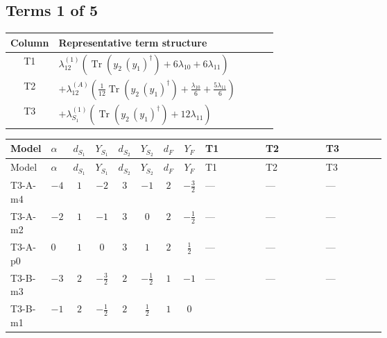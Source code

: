 \documentclass[8pt]{article}
\begin{document}
\begin{landscape}
\subsection*{Terms 1 of 5}
\begin{center}
\begin{tabular}{@{}c >{\raggedright\arraybackslash}p{0.82\linewidth}@{}}
\toprule
Column & Representative term structure \\
\midrule
T1 & \(\displaystyle {\lambda_{12}^{(1)}} (\operatorname{Tr}\!\left({y_2}\,\left({y_1}\right)^{\dagger}\right)+6 {\lambda_{10}}+6 {\lambda_{11}})\) \\
\midrule
T2 & \(\displaystyle +{\lambda_{12}^{(A)}} \left(\frac{1}{12} \operatorname{Tr}\!\left({y_2}\,\left({y_1}\right)^{\dagger}\right)+\frac{{\lambda_{10}}}{6}+\frac{5 {\lambda_{11}}}{6}\right)\) \\
\midrule
T3 & \(\displaystyle +{\lambda_{S_1}^{(1)}} (\operatorname{Tr}\!\left({y_2}\,\left({y_1}\right)^{\dagger}\right)+12 {\lambda_{11}})\) \\
\midrule
\bottomrule
\end{tabular}
\end{center}
\smallskip
\tiny
\begin{longtable}{@{}llcccccc >{\raggedright\arraybackslash}p{0.21\linewidth} >{\raggedright\arraybackslash}p{0.21\linewidth} >{\raggedright\arraybackslash}p{0.21\linewidth}@{}}
\toprule
Model & $\alpha$ & $d_{S_1}$ & $Y_{S_1}$ & $d_{S_2}$ & $Y_{S_2}$ & $d_F$ & $Y_F$ & T1 & T2 & T3 \\
\midrule
\endfirsthead
\toprule
Model & $\alpha$ & $d_{S_1}$ & $Y_{S_1}$ & $d_{S_2}$ & $Y_{S_2}$ & $d_F$ & $Y_F$ & T1 & T2 & T3 \\
\midrule
\endhead
T3-A-m4 & $-4$ & $1$ & $-2$ & $3$ & $-1$ & $2$ & $-\frac{3}{2}$ & --- & --- & --- \\
\midrule
T3-A-m2 & $-2$ & $1$ & $-1$ & $3$ & $0$ & $2$ & $-\frac{1}{2}$ & --- & --- & --- \\
\midrule
T3-A-p0 & $0$ & $1$ & $0$ & $3$ & $1$ & $2$ & $\frac{1}{2}$ & --- & --- & --- \\
\midrule
T3-B-m3 & $-3$ & $2$ & $-\frac{3}{2}$ & $2$ & $-\frac{1}{2}$ & $1$ & $-1$ & --- & --- & --- \\
\midrule
T3-B-m1 & $-1$ & $2$ & $-\frac{1}{2}$ & $2$ & $\frac{1}{2}$ & $1$ & $0$ & \scriptsize\adjustbox{max width=\linewidth}{$\begin{gathered} {\lambda_{12}^{(1)}} (\operatorname{Tr}\!\left({y_2}\,\left({y_1}\right)^{\dagger}\right)+6 {\lambda_{10}}+6 {\lambda_{11}})\end{gathered}$} & \scriptsize\adjustbox{max width=\linewidth}{$\begin{gathered} +{\lambda_{12}^{(A)}} \left(\frac{1}{12} \operatorname{Tr}\!\left({y_2}\,\left({y_1}\right)^{\dagger}\right)+\frac{{\lambda_{10}}}{6}+\frac{5 {\lambda_{11}}}{6}\right)\end{gathered}$} & \scriptsize\adjustbox{max width=\linewidth}{$\begin{gathered} +{\lambda_{S_1}^{(1)}} (\operatorname{Tr}\!\left({y_2}\,\left({y_1}\right)^{\dagger}\right)+12 {\lambda_{11}})\end{gathered}$} \\

\end{longtable}
\end{landscape}
\end{document}
